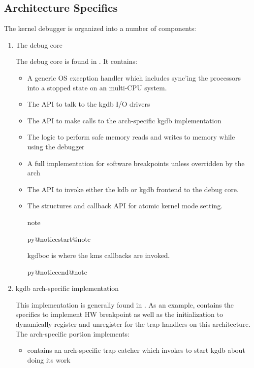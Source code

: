\documentclass[a4paper,8pt,english]{sphinxmanual}
\makeatletter
\renewenvironment{notice}[2]{%
          \def\py@noticetype{#1}
          \begin{coloredbox}{#1}
          \bf\it
          \par\strong{#2}
          \csname py@noticestart@#1\endcsname
        }
	{
          \csname py@noticeend@\py@noticetype\endcsname
          \end{coloredbox}
        }
\makeatother
\begin{document}
\subsection{Architecture Specifics}
\label{dev-tools/kgdb:architecture-specifics}
The kernel debugger is organized into a number of components:
\begin{enumerate}
\item {} 
The debug core

The debug core is found in . It
contains:
\begin{itemize}
\item {} 
A generic OS exception handler which includes sync'ing the
processors into a stopped state on an multi-CPU system.

\item {} 
The API to talk to the kgdb I/O drivers

\item {} 
The API to make calls to the arch-specific kgdb implementation

\item {} 
The logic to perform safe memory reads and writes to memory while
using the debugger

\item {} 
A full implementation for software breakpoints unless overridden
by the arch

\item {} 
The API to invoke either the kdb or kgdb frontend to the debug
core.

\item {} 
The structures and callback API for atomic kernel mode setting.

\begin{notice}{note}{Note:}
kgdboc is where the kms callbacks are invoked.
\end{notice}

\end{itemize}

\item {} 
kgdb arch-specific implementation

This implementation is generally found in . As
an example,  contains the specifics to
implement HW breakpoint as well as the initialization to dynamically
register and unregister for the trap handlers on this architecture.
The arch-specific portion implements:
\begin{itemize}
\item {} 
contains an arch-specific trap catcher which invokes
 to start kgdb about doing its work


\end{itemize}
\end{enumerate}
\end{document}
